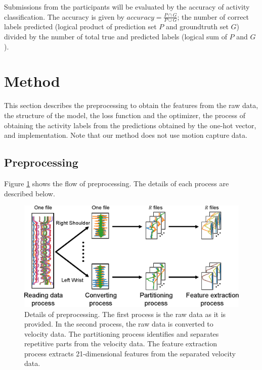 \documentclass[graybox]{svmult}
\begin{document}
Submissions from the participants will be evaluated by the accuracy of activity classification. The accuracy is given by $accuracy = \frac{P\cap G}{P\cup G}$; the number of correct labels predicted (logical product of prediction set $P$ and groundtruth set $G$) divided by the number of total true and predicted labels (logical sum of $P$ and $G$).



\section{Method}
\label{sec:method}
This section describes the preprocessing to obtain the features from the raw data, the structure of the model, the loss function and the optimizer, the process of obtaining the activity labels from the predictions obtained by the one-hot vector, and implementation. Note that our method does not use motion capture data.


\subsection{Preprocessing}
\label{sec:preprocess}
Figure \ref{fig:preprocess} shows the flow of preprocessing. The details of each process are described below.

\begin{figure}[h]
    \centering
    \includegraphics[width=0.8\linewidth]{figures/preprocess.eps}
    \caption{Details of preprocessing. The first process is the raw data as it is provided. In the second process, the raw data is converted to velocity data. The partitioning process identifies and separates repetitive parts from the velocity data. The feature extraction process extracts 21-dimensional features from the separated velocity data.}
    \label{fig:preprocess}
\end{figure}
\end{document}
